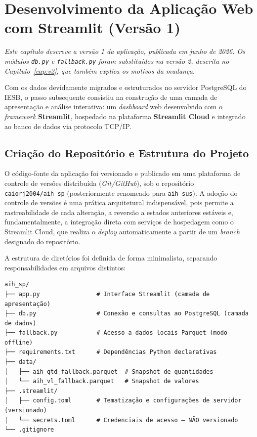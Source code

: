 \documentclass[12pt,a4paper]{report}
\begin{document}
\chapter{Desenvolvimento da Aplicação Web com Streamlit (Versão 1)}\label{cap:streamlit}

\textit{Este capítulo descreve a versão 1 da aplicação, publicada em junho de 2026. Os módulos \texttt{db.py} e \texttt{fallback.py} foram substituídos na versão 2, descrita no Capítulo~\ref{cap:v2}, que também explica os motivos da mudança.}

Com os dados devidamente migrados e estruturados no servidor PostgreSQL do IESB, o
passo subsequente consistiu na construção de uma camada de apresentação e análise
interativa: um \textit{dashboard} web desenvolvido com o \textit{framework}
\textbf{Streamlit}, hospedado na plataforma \textbf{Streamlit Cloud} e integrado ao
banco de dados via protocolo TCP/IP.

\section{Criação do Repositório e Estrutura do Projeto}

O código-fonte da aplicação foi versionado e publicado em uma plataforma de controle de
versões distribuída (\textit{Git/GitHub}), sob o repositório
\texttt{caiorj2004/aih\_sp} (posteriormente renomeado para \texttt{aih\_sus}). A adoção do controle de versões é uma prática
arquitetural indispensável, pois permite a rastreabilidade de cada alteração, a
reversão a estados anteriores estáveis e, fundamentalmente, a integração direta com
serviços de hospedagem como o Streamlit Cloud, que realiza o \textit{deploy}
automaticamente a partir de um \textit{branch} designado do repositório.

A estrutura de diretórios foi definida de forma minimalista, separando
responsabilidades em arquivos distintos:

\begin{verbatim}
aih_sp/
├── app.py                # Interface Streamlit (camada de apresentação)
├── db.py                 # Conexão e consultas ao PostgreSQL (camada de dados)
├── fallback.py           # Acesso a dados locais Parquet (modo offline)
├── requirements.txt      # Dependências Python declarativas
├── data/
│   ├── aih_qtd_fallback.parquet  # Snapshot de quantidades
│   └── aih_vl_fallback.parquet   # Snapshot de valores
├── .streamlit/
│   ├── config.toml       # Tematização e configurações de servidor (versionado)
│   └── secrets.toml      # Credenciais de acesso — NÃO versionado
└── .gitignore
\end{verbatim}
\end{document}
